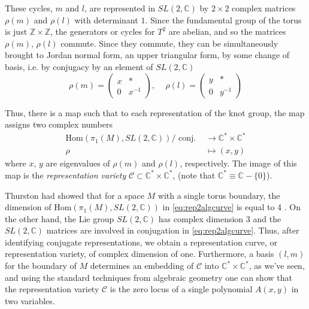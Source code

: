 \documentclass[a4paper,titlepage,twoside]{book}
\begin{document}
These cycles, $m$ and $l$, are represented in $SL(2,\mathbb{C})$ by $2\times 2$ complex matrices $\rho(m)$ and $\rho(l)$ with determinant $1$.  Since the fundamental group of the torus is just $\mathbb{Z}\times \mathbb{Z}$, the generators or cycles for $T^2$ are abelian, and so the matrices $\rho(m)$, $\rho(l)$ commute.  Since they commute, they can be simultaneously brought to Jordan normal form, an upper triangular form, by some change of basis, i.e. by conjugacy by an element of $SL(2,\mathbb{C})$
\begin{equation}
  \rho(m) = \left( \begin{matrix} x & * \\ 0  & x^{-1} \end{matrix} \right), \quad \, \rho(l) = \left( \begin{matrix} y & * \\ 
    0 & y^{-1} \end{matrix} \right)
\end{equation}

Thus, there is a map such that to each representation of the knot group, the map assigns two complex numbers
\begin{equation}
  \begin{aligned}
    \text{Hom}{ (\pi_1(M), SL(2,\mathbb{C}) )} / \text{ conj. } & \to \mathbb{C}^* \times \mathbb{C}^* \\ 
    \rho & \mapsto (x,y) 
\end{aligned} \label{eq:rep2algcurve}
\end{equation}
where $x$, $y$ are eigenvalues of $\rho(m)$ and $\rho(l)$, respectively. The image of this map is the \emph{representation variety} $\mathcal{C} \subset \mathbb{C}^* \times \mathbb{C}^*$, (note that $\mathbb{C}^* \equiv \mathbb{C} - \lbrace 0 \rbrace$).  

Thurston had showed that for a space $M$ with a single torus boundary, the dimension of $\text{Hom}{ (\pi_1(M), SL{(2,\mathbb{C})} )}$ in \eqref{eq:rep2algcurve} is equal to 4 \cite{Thurston1977}.  On the other hand, the Lie group $SL(2,\mathbb{C})$ has complex dimension 3 and the $SL(2,\mathbb{C})$ matrices are involved in conjugation in \eqref{eq:rep2algcurve}.  Thus, after identifying conjugate representations, we obtain a representation curve, or representation variety, of complex dimension of one.  Furthermore, a basis $(l,m)$ for the boundary of $M$ determines an embedding of $\mathcal{C}$ into $\mathbb{C}^* \times \mathbb{C}^*$, as we've seen, and using the standard techniques from algebraic geometry one can show that the representation variety $\mathcal{C}$ is the zero locus of a single polynomial $A(x,y)$ in two variables.  
\end{document}
